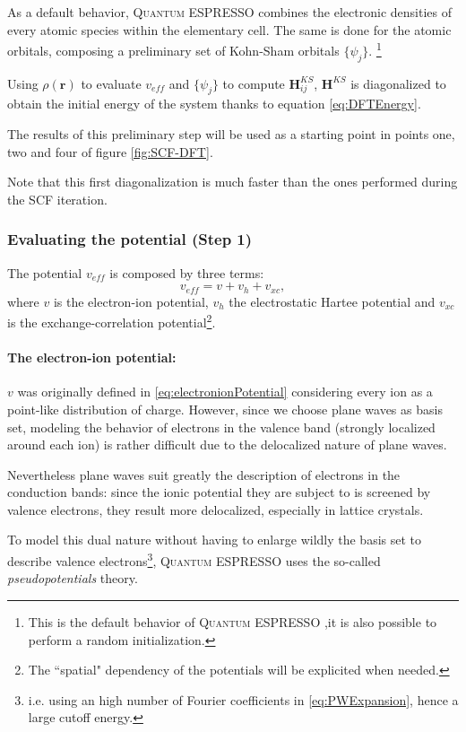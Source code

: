 \documentclass[a4paper,12pt]{article}
\newcommand\mf[1]{\mathbf{#1}}
\newcommand\dens{\rho(\mathbf{r})}
\newcommand\QE{\textsc{Quantum} ESPRESSO }
\begin{document}
As a default behavior, \QE combines the electronic densities of every atomic species within the elementary cell.
The same is done for the atomic orbitals, composing a preliminary set of Kohn-Sham orbitals $\{\psi_j\}$.
\footnote{This is the default behavior of \QE ,it is also possible to perform a random initialization.}

Using $\dens$ to evaluate $v_{eff}$ and $\{\psi_j\}$ to compute $\mf{H}_{ij}^{KS}$, $\mf{H}^{KS}$ is diagonalized to obtain the initial energy of the system thanks to equation \eqref{eq:DFTEnergy}. 

The results of this preliminary step will be used as a starting point in points one, two and four of figure \ref{fig:SCF-DFT}.

Note that this first diagonalization is much faster than the ones performed during the SCF iteration.




\subsubsection{Evaluating the potential (Step 1)}\label{sec:Potential}

The potential $v_{eff}$ is composed by three terms:
\begin{equation}
	v_{eff} = v + v_{h} + v_{xc},
\end{equation}
where $v$ is the electron-ion potential, $v_{h}$ the electrostatic Hartee potential and $v_{xc}$ is the exchange-correlation potential\footnote{The ``spatial" dependency of the potentials will be explicited when needed.}.

\paragraph{The electron-ion potential:}
$v$ was originally defined in \eqref{eq:electronionPotential} considering every ion as a point-like distribution of charge. 
However, since we choose plane waves as basis set, modeling the behavior of electrons in the valence band (strongly localized around each ion) is rather difficult due to the delocalized nature of plane waves.

Nevertheless plane waves suit greatly the description of electrons in the conduction bands: since the ionic potential they are subject to is screened by valence electrons\cite[p.136]{Manini}, they result more delocalized, especially in lattice crystals.

To model this dual nature without having to enlarge wildly the basis set to describe valence electrons\footnote{i.e. using an high number of Fourier coefficients in \eqref{eq:PWExpansion}, hence a large cutoff energy.}, \QE uses the so-called \textit{pseudopotentials} theory.
\end{document}
